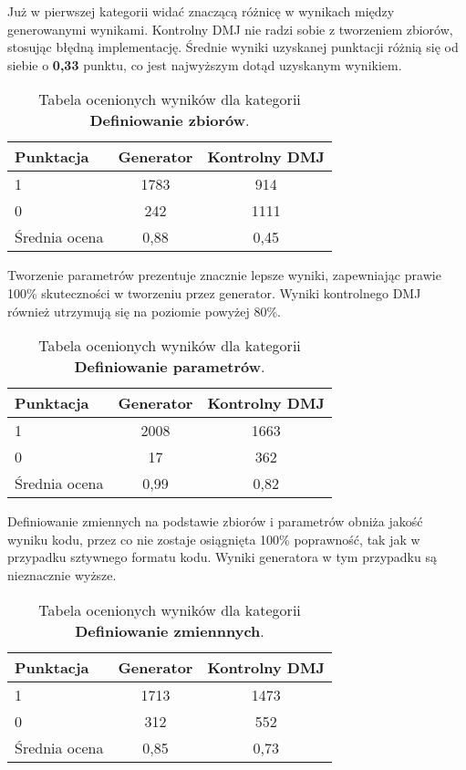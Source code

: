 
Już w pierwszej kategorii widać znaczącą różnicę w wynikach między generowanymi wynikami. Kontrolny DMJ nie radzi sobie z tworzeniem zbiorów, stosując błędną implementację. Średnie wyniki uzyskanej punktacji różnią się od siebie o \textbf{0,33} punktu, co jest najwyższym dotąd uzyskanym wynikiem.

\begin{table}[H]
\caption{Tabela ocenionych wyników dla kategorii \textbf{Definiowanie zbiorów}.}\label{tab:tabela17}
\centering%
\begin{tabular}{|l|c|c|}
\hline
\textbf{Punktacja} & \textbf{Generator} & \textbf{Kontrolny DMJ}\\
\hline
1 & 1783 & 914 \\
\hline
0 & 242 & 1111 \\
\hline
Średnia ocena & 0,88 & 0,45 \\
\hline
\end{tabular}
\end{table}

Tworzenie parametrów prezentuje znacznie lepsze wyniki, zapewniając prawie 100\% skuteczności w tworzeniu przez generator. Wyniki kontrolnego DMJ również utrzymują się na poziomie powyżej 80\%.

\begin{table}[H]
\caption{Tabela ocenionych wyników dla kategorii \textbf{Definiowanie parametrów}.}\label{tab:tabela18}
\centering%
\begin{tabular}{|l|c|c|}
\hline
\textbf{Punktacja} & \textbf{Generator} & \textbf{Kontrolny DMJ}\\
\hline
1 & 2008 & 1663 \\
\hline
0 & 17 & 362 \\
\hline
Średnia ocena & 0,99 & 0,82 \\
\hline
\end{tabular}
\end{table}

Definiowanie zmiennych na podstawie zbiorów i parametrów obniża jakość wyniku kodu, przez co nie zostaje osiągnięta 100\% poprawność, tak jak w przypadku sztywnego formatu kodu. Wyniki generatora w tym przypadku są nieznacznie wyższe.

\begin{table}[H]
\caption{Tabela ocenionych wyników dla kategorii \textbf{Definiowanie zmiennnych}.}\label{tab:tabela19}
\centering%
\begin{tabular}{|l|c|c|}
\hline
\textbf{Punktacja} & \textbf{Generator} & \textbf{Kontrolny DMJ}\\
\hline
1 & 1713 & 1473 \\
\hline
0 & 312 & 552 \\
\hline
Średnia ocena & 0,85 & 0,73 \\
\hline
\end{tabular}
\end{table}


